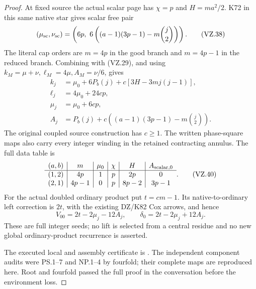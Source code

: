 \begin{proof}
At fixed source the actual scalar page has \(\chi=p\) and
\(H=ma^2/2\). K72 in this same native star gives scalar free pair
\[
 (\mu_{\rm sc},\nu_{\rm sc})=
 \left(6p,\ 6\left((a-1)(3p-1)-m\binom j2\right)\right).
                                                               \tag{VZ.38}
\]
The literal cap orders are \(m=4p\) in the good branch and \(m=4p-1\)
in the reduced branch. Combining with (VZ.29), and using
\(k_M=\mu+\nu,\ell_M=4\mu,A_M=\nu/6\), gives
\[
 \begin{aligned}
 k_j&=\mu_0+6P_b(j)+c[3H-3m j(j-1)],\\
 \ell_j&=4\mu_0+24cp,\\
 \mu_j&=\mu_0+6cp,\\
 A_j&=P_b(j)+c\left((a-1)(3p-1)-m\binom j2\right).
 \end{aligned}                                       \tag{VZ.39}
\]
The original coupled source construction has \(c\ge1\). The written
phase-square maps also carry every integer winding in the retained
contracting annulus. The full data table is
\[
 \begin{array}{c|c|c|c|c|c}
 (a,b)&m&\mu_0&\chi&H&A_{\rm scalar,0}\\\hline
 (1,2)&4p&1&p&2p&0\\
 (2,1)&4p-1&0&p&8p-2&3p-1
 \end{array}.                                        \tag{VZ.40}
\]
For the actual doubled ordinary product put \(t=cm-1\).
Its native-to-ordinary left correction is \(2t\), with the existing
DZ/K82 Cox arrows, and hence
\[
 V_{00}=2t-2\mu_j-12A_j,\qquad
 \delta_0=2t-2\mu_j+12A_j.                            \tag{VZ.41}
\]
These are full integer seeds; no lift is selected from a central
residue and no new global ordinary-product recurrence is asserted.

The executed local and assembly certificate is
. The independent component
audits were PS.1--7 and NP.1--4 by fourfold; their complete maps are
reproduced here. Root and fourfold passed the full proof in the
conversation before the environment loss.
\end{proof}
